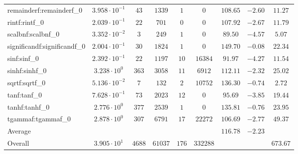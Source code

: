 \begin{tabular}{|l|c|c|c|c|c|c|c|c|}
remainderf:remainderf\_0     & $ 3.958 \cdot 10^{-1} $ & $ 43     $ & $ 1339  $ & $ 1   $ & $ 0      $ & $ 108.65      $ & $ -2.60   $ & $ 11.27   $ \\
rintf:rintf\_0               & $ 2.039 \cdot 10^{-1} $ & $ 22     $ & $ 701   $ & $ 0   $ & $ 0      $ & $ 107.92      $ & $ -2.67   $ & $ 11.79   $ \\
scalbnf:scalbnf\_0           & $ 3.352 \cdot 10^{-2} $ & $ 3      $ & $ 249   $ & $ 1   $ & $ 0      $ & $ 89.50       $ & $ -4.57   $ & $ 5.07    $ \\
significandf:significandf\_0 & $ 2.004 \cdot 10^{-1} $ & $ 30     $ & $ 1824  $ & $ 1   $ & $ 0      $ & $ 149.70      $ & $ -0.08   $ & $ 22.34   $ \\
sinf:sinf\_0                 & $ 2.392 \cdot 10^{-1} $ & $ 22     $ & $ 1197  $ & $ 10  $ & $ 16384  $ & $ 91.97       $ & $ -4.27   $ & $ 11.54   $ \\
sinhf:sinhf\_0               & $ 3.238 \cdot 10^{0}  $ & $ 363    $ & $ 3058  $ & $ 11  $ & $ 6912   $ & $ 112.11      $ & $ -2.32   $ & $ 25.02   $ \\
sqrtf:sqrtf\_0               & $ 5.136 \cdot 10^{-2} $ & $ 7      $ & $ 132   $ & $ 2   $ & $ 10752  $ & $ 136.30      $ & $ -0.74   $ & $ 2.72    $ \\
tanf:tanf\_0                 & $ 7.628 \cdot 10^{-1} $ & $ 73     $ & $ 2023  $ & $ 12  $ & $ 0      $ & $ 95.69       $ & $ -3.85   $ & $ 19.44   $ \\
tanhf:tanhf\_0               & $ 2.776 \cdot 10^{0}  $ & $ 377    $ & $ 2539  $ & $ 1   $ & $ 0      $ & $ 135.81      $ & $ -0.76   $ & $ 23.95   $ \\
tgammaf:tgammaf\_0           & $ 2.878 \cdot 10^{0}  $ & $ 307    $ & $ 6791  $ & $ 17  $ & $ 22272  $ & $ 106.69      $ & $ -2.77   $ & $ 49.37   $ \\
\hline
Average                      & $                     $ & $        $ & $       $ & $     $ & $        $ & $ 116.78      $ & $ -2.23   $ & $         $ \\
\hline
Overall                      & $ 3.905 \cdot 10^{1}  $ & $ 4688   $ & $ 61037 $ & $ 176 $ & $ 332288 $ & $             $ & $         $ & $ 673.67  $ \\
\hline
\end{tabular}
